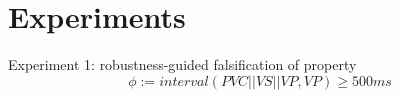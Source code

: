 \section{Experiments}
\label{experiments}
Experiment 1: robustness-guided falsification of property
\[\phi := interval(PVC || VS ||VP, VP) \geq 500ms \]

